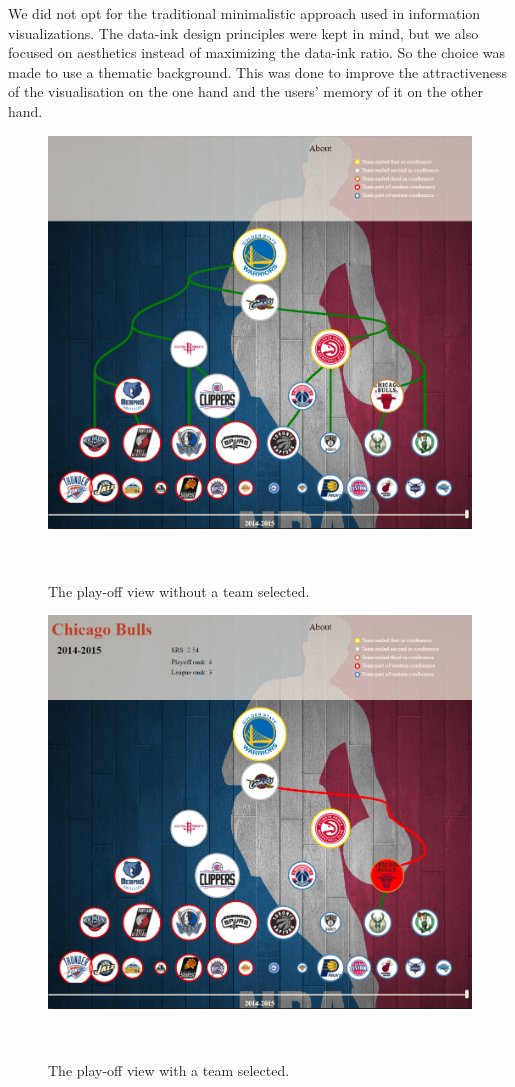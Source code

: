 \documentclass[]{sigchi}
\begin{document}
We did not opt for the traditional minimalistic approach used in information 
visualizations. The data-ink design principles were kept in mind, but we also 
focused on aesthetics instead of maximizing the data-ink ratio. So the choice 
was made to use a thematic background. This was done to improve the 
attractiveness of the visualisation on the one hand and the users' memory of 
it on the other hand\cite{aesthetics}. 

\begin{figure}
\centering
  \includegraphics[width=1.0\columnwidth]{figures/playoffviewwithcontext}
  \caption{The play-off view without a team selected.}~\label{fig:playoffviewnoteam}
\end{figure}

\begin{figure}
\centering
  \includegraphics[width=1.0\columnwidth]{figures/playoffviewteamselected}
  \caption{The play-off view with a team selected.}~\label{fig:playoffviewteam}
\end{figure}
\end{document}
